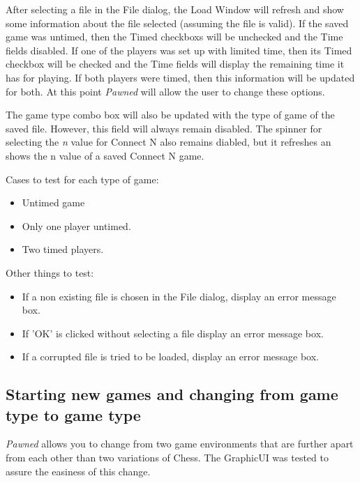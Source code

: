 \documentclass{report}
\begin{document}
			After selecting a file in the File dialog, the Load Window will refresh and
			show some information about the file selected (assuming the file is valid).
			If the saved game was untimed, then the Timed checkboxs will be unchecked and
			the Time fields disabled. If one of the players was set up with limited time, 
			then its Timed checkbox will be checked and the Time fields will display the
			remaining time it has for playing. If both players were timed, then this
			information will be updated for both. At this point \emph{Pawned} will allow 
			the user to change these options. 
			
			The game type combo box will also be updated with the type of game of the 
			saved file. However, this field will always remain disabled. The spinner for
			selecting the \textsl{n} value for Connect N also remains diabled, but it
			refreshes an shows the n value of a saved Connect N game.
			
			Cases to test for each type of game:
			\begin{itemize}
					\item Untimed game
					\item Only one player untimed.
					\item Two timed players.
				\end{itemize}
			
			Other things to test:			
			\begin{itemize}
					\item If a non existing file is chosen in the File dialog, display an 
								error message box.
					\item If 'OK' is clicked without selecting a file display an error message
								box.
					\item If a corrupted file is tried to be loaded, display an error message box.
				\end{itemize}


			\subsection{Starting new games and changing from game type to game type}
			
			\emph{Pawned} allows you to change from two game environments that are further 
			apart from each other than two variations of Chess. The GraphicUI was tested to 
			assure the easiness of this change.		

	
\end{document}
